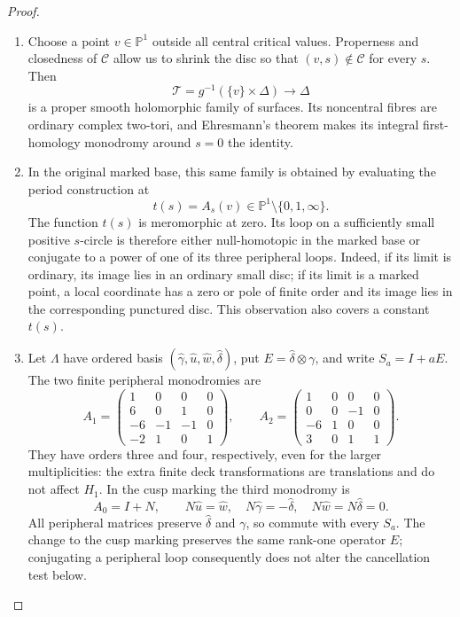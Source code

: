 \begin{proof}
\begin{enumerate}[label={$\langle1\rangle$\arabic*.},leftmargin=*]
\item Choose a point $v\in\mathbb P^1$ outside all central
critical values.  Properness and closedness of
$\mathcal C$ allow us to shrink the disc so that
$(v,s)\notin\mathcal C$ for every $s$.  Then
\[
 \mathcal T=g^{-1}(\{v\}\times\Delta)\longrightarrow\Delta
\]
is a proper smooth holomorphic family of surfaces.
Its noncentral fibres are ordinary complex two-tori, and
Ehresmann's theorem makes its integral first-homology
monodromy around $s=0$ the identity.

\item In the original marked base, this same family is obtained
by evaluating the period construction at
\[
 t(s)=A_s(v)\in\mathbb P^1\setminus\{0,1,\infty\}.
\]
The function $t(s)$ is meromorphic at zero.  Its loop on a
sufficiently small positive $s$-circle is therefore either
null-homotopic in the marked base or conjugate to a power
of one of its three peripheral loops.  Indeed, if its
limit is ordinary, its image lies in an ordinary small
disc; if its limit is a marked point, a local coordinate
has a zero or pole of finite order and its image lies
in the corresponding punctured disc.  This observation
also covers a constant $t(s)$.

\item Let $\Lambda$ have ordered basis
$(\widehat\gamma,\widehat u,\widehat w,\widehat\delta)$,
put $E=\widehat\delta\otimes\gamma$, and write
$S_a=I+aE$.  The two finite peripheral monodromies are
\[
 A_1=\begin{pmatrix}
 1&0&0&0\\6&0&1&0\\-6&-1&-1&0\\-2&1&0&1
 \end{pmatrix},\qquad
 A_2=\begin{pmatrix}
 1&0&0&0\\0&0&-1&0\\-6&1&0&0\\3&0&1&1
 \end{pmatrix}.
\]
They have orders three and four, respectively, even for
the larger multiplicities: the extra finite deck
transformations are translations and do not affect
$H_1$.  In the cusp marking the third monodromy is
\[
 A_0=I+N,\qquad
 N\widehat u=\widehat w,\quad
 N\widehat\gamma=-\widehat\delta,\quad
 N\widehat w=N\widehat\delta=0.
\]
All peripheral matrices preserve $\widehat\delta$ and
$\gamma$, so commute with every $S_a$.  The change to
the cusp marking preserves the same rank-one operator
$E$; conjugating a peripheral loop consequently does
not alter the cancellation test below.


\end{enumerate}
\end{proof}
